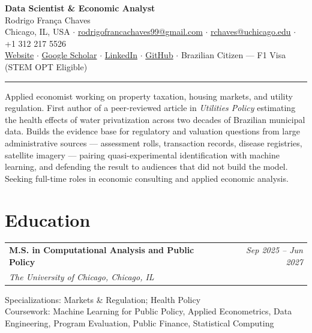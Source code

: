 \documentclass[10pt, letterpaper]{article}
\makeatletter
\newcommand{\cvedu}[4]{%
  \noindent
  \begin{tabularx}{\linewidth}{@{}X r@{}}
    \textbf{#1} & \textit{\small #4} \\[0pt]
    \textit{\small #2, #3} & \\
  \end{tabularx}%
  \vspace{0pt}%
}
\makeatother
\begin{document}
\begin{center}
  {\LARGE\bfseries Data Scientist \& Economic Analyst}\\[3pt]
  {\large Rodrigo França Chaves}\\[3pt]
  {\small
    Chicago, IL, USA \enspace$\cdot$\enspace
    \href{mailto:rodrigofrancachaves99@gmail.com}{rodrigofrancachaves99@gmail.com} \enspace$\cdot$\enspace
    \href{mailto:rchaves@uchicago.edu}{rchaves@uchicago.edu} \enspace$\cdot$\enspace
    +1 312 217 5526
  }\\[1.5pt]
  {\small
    \href{https://rodrigofch7.github.io}{Website} \enspace$\cdot$\enspace
    \href{https://scholar.google.com.br/citations?user=6D65dqUAAAAJ}{Google Scholar} \enspace$\cdot$\enspace
    \href{https://www.linkedin.com/in/rodrigofrancac}{LinkedIn} \enspace$\cdot$\enspace
    \href{https://github.com/Rodrigofch7}{GitHub} \enspace$\cdot$\enspace
    Brazilian Citizen — F1 Visa (STEM OPT Eligible)
  }
\end{center}

\vspace{1pt}
{\rule{\linewidth}{0.8pt}}
\vspace{3pt}

{\small
Applied economist working on property taxation, housing markets, and utility regulation. First author of a peer-reviewed article in \textit{Utilities Policy} estimating the health effects of water privatization across two decades of Brazilian municipal data. Builds the evidence base for regulatory and valuation questions from large administrative sources — assessment rolls, transaction records, disease registries, satellite imagery — pairing quasi-experimental identification with machine learning, and defending the result to audiences that did not build the model. Seeking full-time roles in economic consulting and applied economic analysis.
\par}

\section{Education}

\cvedu{M.S. in Computational Analysis and Public Policy}{The University of Chicago}{Chicago, IL}{Sep 2025 – Jun 2027}
{\small Specializations: Markets \& Regulation; Health Policy \\
Coursework: Machine Learning for Public Policy, Applied Econometrics, Data Engineering, Program Evaluation, Public Finance, Statistical Computing}
\end{document}
